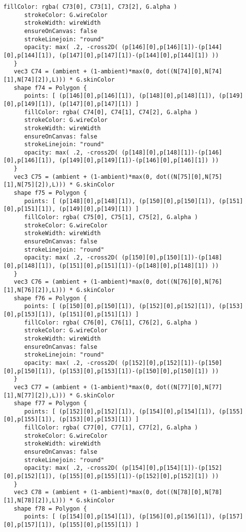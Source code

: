 \begin{lstlisting}[language=Sty-RT,escapechar=@]
      fillColor: rgba( C73[0], C73[1], C73[2], G.alpha )
      strokeColor: G.wireColor
      strokeWidth: wireWidth
      ensureOnCanvas: false
      strokeLinejoin: "round"
      opacity: max( .2, -cross2D( (p[146][0],p[146][1])-(p[144][0],p[144][1]), (p[147][0],p[147][1])-(p[144][0],p[144][1]) ))
   }
   vec3 C74 = (ambient + (1-ambient)*max(0, dot((N[74][0],N[74][1],N[74][2]),L))) * G.skinColor
   shape f74 = Polygon {
      points: [ (p[146][0],p[146][1]), (p[148][0],p[148][1]), (p[149][0],p[149][1]), (p[147][0],p[147][1]) ]
      fillColor: rgba( C74[0], C74[1], C74[2], G.alpha )
      strokeColor: G.wireColor
      strokeWidth: wireWidth
      ensureOnCanvas: false
      strokeLinejoin: "round"
      opacity: max( .2, -cross2D( (p[148][0],p[148][1])-(p[146][0],p[146][1]), (p[149][0],p[149][1])-(p[146][0],p[146][1]) ))
   }
   vec3 C75 = (ambient + (1-ambient)*max(0, dot((N[75][0],N[75][1],N[75][2]),L))) * G.skinColor
   shape f75 = Polygon {
      points: [ (p[148][0],p[148][1]), (p[150][0],p[150][1]), (p[151][0],p[151][1]), (p[149][0],p[149][1]) ]
      fillColor: rgba( C75[0], C75[1], C75[2], G.alpha )
      strokeColor: G.wireColor
      strokeWidth: wireWidth
      ensureOnCanvas: false
      strokeLinejoin: "round"
      opacity: max( .2, -cross2D( (p[150][0],p[150][1])-(p[148][0],p[148][1]), (p[151][0],p[151][1])-(p[148][0],p[148][1]) ))
   }
   vec3 C76 = (ambient + (1-ambient)*max(0, dot((N[76][0],N[76][1],N[76][2]),L))) * G.skinColor
   shape f76 = Polygon {
      points: [ (p[150][0],p[150][1]), (p[152][0],p[152][1]), (p[153][0],p[153][1]), (p[151][0],p[151][1]) ]
      fillColor: rgba( C76[0], C76[1], C76[2], G.alpha )
      strokeColor: G.wireColor
      strokeWidth: wireWidth
      ensureOnCanvas: false
      strokeLinejoin: "round"
      opacity: max( .2, -cross2D( (p[152][0],p[152][1])-(p[150][0],p[150][1]), (p[153][0],p[153][1])-(p[150][0],p[150][1]) ))
   }
   vec3 C77 = (ambient + (1-ambient)*max(0, dot((N[77][0],N[77][1],N[77][2]),L))) * G.skinColor
   shape f77 = Polygon {
      points: [ (p[152][0],p[152][1]), (p[154][0],p[154][1]), (p[155][0],p[155][1]), (p[153][0],p[153][1]) ]
      fillColor: rgba( C77[0], C77[1], C77[2], G.alpha )
      strokeColor: G.wireColor
      strokeWidth: wireWidth
      ensureOnCanvas: false
      strokeLinejoin: "round"
      opacity: max( .2, -cross2D( (p[154][0],p[154][1])-(p[152][0],p[152][1]), (p[155][0],p[155][1])-(p[152][0],p[152][1]) ))
   }
   vec3 C78 = (ambient + (1-ambient)*max(0, dot((N[78][0],N[78][1],N[78][2]),L))) * G.skinColor
   shape f78 = Polygon {
      points: [ (p[154][0],p[154][1]), (p[156][0],p[156][1]), (p[157][0],p[157][1]), (p[155][0],p[155][1]) ]

\end{lstlisting}
